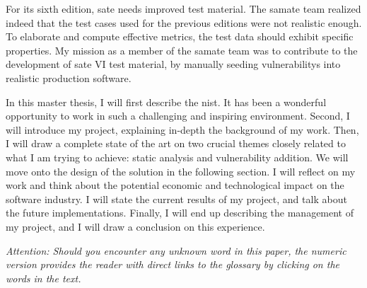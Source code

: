 For its sixth edition, \gls{sate} needs improved test material. The \gls{samate} team realized indeed that the test cases used for the previous editions were not realistic enough. To elaborate and compute effective metrics, the test data should exhibit specific properties. My mission as a member of the \gls{samate} team was to contribute to the development of \gls{sate} VI test material, by manually seeding \glspl{vulnerability} into realistic production software.

In this master thesis, I will first describe the \acrfull{nist}. It has been a wonderful opportunity to work in such a challenging and inspiring environment. Second, I will introduce my project, explaining in-depth the background of my work. Then, I will draw a complete state of the art on two crucial themes closely related to what I am trying to achieve: static analysis and vulnerability addition. We will move onto the design of the solution in the following section. I will reflect on my work and think about the potential economic and technological impact on the software industry. I will state the current results of my project, and talk about the future implementations. Finally, I will end up describing the management of my project, and I will draw a conclusion on this experience.

\vfill

\emph{Attention: Should you encounter any unknown word in this paper, the numeric version provides the reader with direct links to the glossary by clicking on the words in the text.}